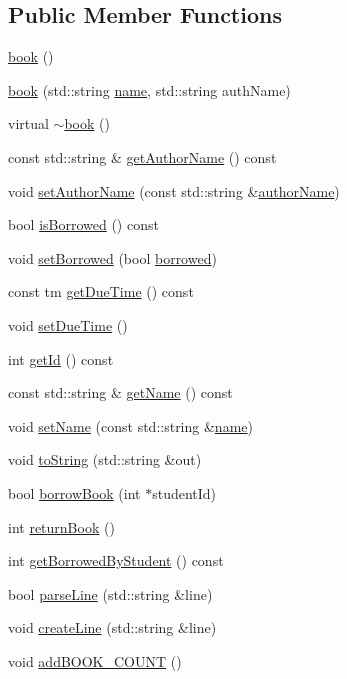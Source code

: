 \subsection*{Public Member Functions}
\begin{DoxyCompactItemize}
\item 
\hyperlink{classbook_ad081661f16222b7195ff4342ba4fdf04}{book} ()
\item 
\hyperlink{classbook_af51e1b11131e522f13d5c4b52a3eed03}{book} (std\+::string \hyperlink{classbook_a5eabc1c1c5abff26997bec3d41f90d9e}{name}, std\+::string auth\+Name)
\item 
virtual \hyperlink{classbook_a807e512df9551f568ed2b7bae11f3884}{$\sim$book} ()
\item 
const std\+::string \& \hyperlink{classbook_a8cfa3bc064dafb1fde6bd997d0075df9}{get\+Author\+Name} () const
\item 
void \hyperlink{classbook_ab6da44e6c1680a8e802a14c2fcd20e78}{set\+Author\+Name} (const std\+::string \&\hyperlink{classbook_a21b2962c6227818732db27f12121b732}{author\+Name})
\item 
bool \hyperlink{classbook_aa76dd75565c10ec36c0f4649341b4fa1}{is\+Borrowed} () const
\item 
void \hyperlink{classbook_a7deed8c0520ef6f6b1dd5ebf9345cc72}{set\+Borrowed} (bool \hyperlink{classbook_ab745520ed537e69bde6f2e3d7a103276}{borrowed})
\item 
const tm \hyperlink{classbook_aa8eda0350d5882656cf53321d559c277}{get\+Due\+Time} () const
\item 
void \hyperlink{classbook_a61624bab2476a61fb2f27ebf7c8976e3}{set\+Due\+Time} ()
\item 
int \hyperlink{classbook_ab0c28db5fce5e04944c8ead875ce0e6a}{get\+Id} () const
\item 
const std\+::string \& \hyperlink{classbook_ae03ca5596d9b2a5992cc9da95d04e0cb}{get\+Name} () const
\item 
void \hyperlink{classbook_a40395f6b694a4c816bcf7a0ef279cf26}{set\+Name} (const std\+::string \&\hyperlink{classbook_a5eabc1c1c5abff26997bec3d41f90d9e}{name})
\item 
void \hyperlink{classbook_a458d26a8ddd01f69083a68eb68bf2181}{to\+String} (std\+::string \&out)
\item 
bool \hyperlink{classbook_a68bc47d79edd93594d50f720be2653f6}{borrow\+Book} (int $\ast$student\+Id)
\item 
int \hyperlink{classbook_af11d02d9964b788986dc8e26d1cdf373}{return\+Book} ()
\item 
int \hyperlink{classbook_a51aa01018a7c1569388aac015578e057}{get\+Borrowed\+By\+Student} () const
\item 
bool \hyperlink{classbook_acf51be6cb1a1e98d461144e134583c8f}{parse\+Line} (std\+::string \&line)
\item 
void \hyperlink{classbook_aea835c54459ec0a4d29d42f2f6f7858d}{create\+Line} (std\+::string \&line)
\item 
void \hyperlink{classbook_a73dd64c834bd70d659ee456f3ef94c05}{add\+B\+O\+O\+K\+\_\+\+C\+O\+U\+NT} ()
\end{DoxyCompactItemize}
